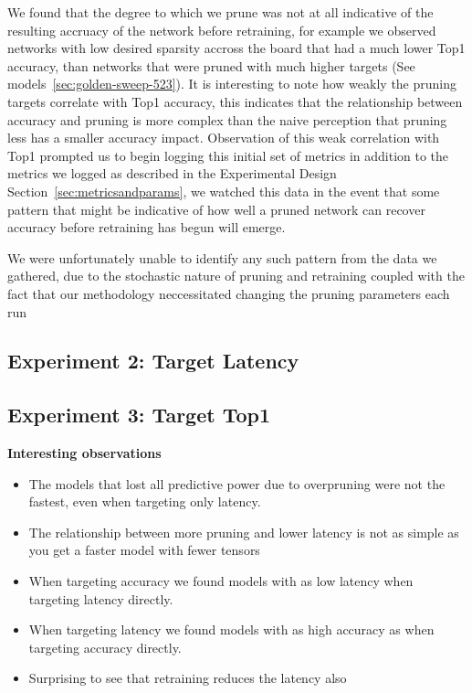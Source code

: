 \documentclass[../Dissertation.tex]{subfiles}
\begin{document}
We found that the degree to which we prune was not at all indicative of the resulting accruacy of the network before retraining, for example we observed networks with low desired sparsity accross the board that had a much lower Top1 accuracy, than networks that were pruned with much higher targets (See models~\ref{sec:golden-sweep-523}).
It is interesting to note how weakly the pruning targets correlate with Top1 accuracy, this indicates that the relationship between accuracy and pruning is more complex than the naive perception that pruning less has a smaller accuracy impact.
Observation of this weak correlation with Top1 prompted us to begin logging this initial set of metrics in addition to the metrics we logged as described in the Experimental Design Section~\ref{sec:metricsandparams}, we watched this data in the event that some pattern that might be indicative of how well a pruned network can recover accuracy before retraining has begun will emerge.

We were unfortunately unable to identify any such pattern from the data we gathered, due to the stochastic nature of pruning and retraining coupled with the fact that our methodology neccessitated changing the pruning parameters each run


\subsection{Experiment 2: Target Latency}

\subsection{Experiment 3: Target Top1}

\textbf{Interesting observations}
\begin{itemize}
    \item The models that lost all predictive power due to overpruning were not the fastest, even when targeting only latency.
    \item The relationship between more pruning and lower latency is not as simple as you get a faster model with fewer tensors
    \item When targeting accuracy we found models with as low latency when targeting latency directly.
    \item When targeting latency we found models with as high accuracy as when targeting accuracy directly.
    \item Surprising to see that retraining reduces the latency also
\end{itemize}
\end{document}
